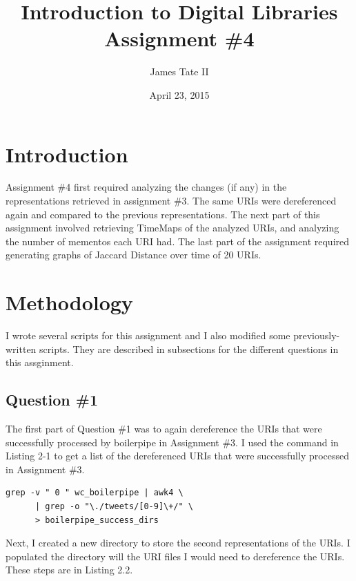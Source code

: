 \documentclass[a4paper,12pt]{article}
\begin{document}
\renewcommand{\thelstlisting}{\thesection.\arabic{lstlisting}}
\renewcommand{\thefigure}{\arabic{section}.\arabic{figure}}
\renewcommand{\thetable}{\arabic{section}.\arabic{table}}
\setlength{\floatsep}{0pt plus 2pt minus 2pt}

\title{Introduction to Digital Libraries Assignment \#4}
\date{April 23, 2015}
\author{James Tate II}
\maketitle

\section{Introduction}
Assignment \#4 first required analyzing the changes (if any) in the representations retrieved
in assignment \#3. The same URIs were dereferenced again and compared to the previous
representations. The next part of this assignment involved retrieving TimeMaps of the
analyzed URIs, and analyzing the number of mementos each URI had. The last part of the
assignment required generating graphs of Jaccard Distance over time of 20 URIs.

\section{Methodology}
I wrote several scripts for this assignment and I also modified some previously-written
scripts. They are described in subsections for the different questions in this assginment.

\subsection{Question \#1}
The first part of Question \#1 was to again dereference the URIs that were successfully
processed by boilerpipe in Assignment \#3\cite{hw3}. I used the command in Listing 2-1 to
get a list of the dereferenced URIs that were successfully processed in Assignment \#3.

\begin{lstlisting}[basicstyle=\ttfamily,caption={Getting URIs that
Succeded Boilerpipe Processing }]
    grep -v " 0 " wc_boilerpipe | awk4 \
      | grep -o "\./tweets/[0-9]\+/" \
      > boilerpipe_success_dirs
\end{lstlisting}

Next, I created a new directory to store the second representations of the URIs. I populated
the directory will the URI files I would need to dereference the URIs. These steps are in
Listing 2.2.
\end{document}
